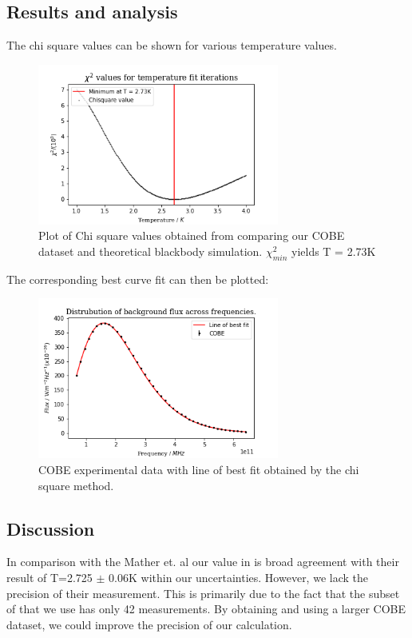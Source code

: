 \documentclass{article}%
\begin{document}
\subsection{Results and analysis}%
\label{subsec:Analysis}%
The chi square values can be shown for various temperature values. \par
\begin{figure}[H]%
\centering%
\includegraphics[width=300px]{task5_fig_b.png}%
\caption{Plot of Chi square values obtained from comparing our COBE dataset and theoretical blackbody simulation. $\chi^2_{min}$ yields T = 2.73K }%
\end{figure}
%
The corresponding best curve fit can then be plotted:
\begin{figure}[H]%
\centering%
\includegraphics[width=300px]{task5_fig_a.png}%
\caption{COBE experimental data with line of best fit obtained by the chi square method.}%
\end{figure}

%
\subsection{Discussion}%
\label{subsec:Discussion}%
In comparison with the Mather et. al our value in is broad agreement with their result of T=2.725 $\pm$ 0.06K \cite{Mather} within our uncertainties.
However, we lack the precision of their measurement. This is primarily due to the fact that the subset of that we use has only 42 measurements.
By obtaining and using a larger COBE dataset, we could improve the precision of our calculation. \par
\end{document}
